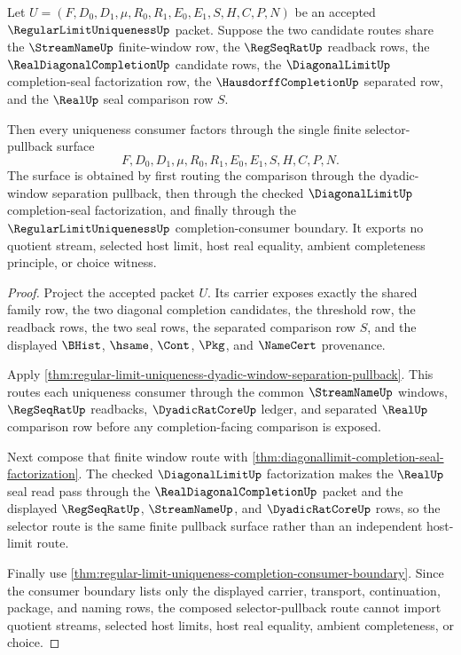 \begin{theorem}
\label{thm:regular-limit-uniqueness-seal-selector-pullback}
Let $U=(F,D_0,D_1,\mu,R_0,R_1,E_0,E_1,S,H,C,P,N)$ be an accepted $\RegularLimitUniquenessUp$ packet. Suppose the two candidate routes share the $\StreamNameUp$ finite-window row, the $\RegSeqRatUp$ readback rows, the $\RealDiagonalCompletionUp$ candidate rows, the $\DiagonalLimitUp$ completion-seal factorization row, the $\HausdorffCompletionUp$ separated row, and the $\RealUp$ seal comparison row $S$.

Then every uniqueness consumer factors through the single finite selector-pullback surface
$$
F,D_0,D_1,\mu,R_0,R_1,E_0,E_1,S,H,C,P,N.
$$
The surface is obtained by first routing the comparison through the dyadic-window separation pullback, then through the checked $\DiagonalLimitUp$ completion-seal factorization, and finally through the $\RegularLimitUniquenessUp$ completion-consumer boundary. It exports no quotient stream, selected host limit, host real equality, ambient completeness principle, or choice witness.
\end{theorem}
\begin{proof}
Project the accepted packet $U$. Its carrier exposes exactly the shared family row, the two diagonal completion candidates, the threshold row, the readback rows, the two seal rows, the separated comparison row $S$, and the displayed $\BHist$, $\hsame$, $\Cont$, $\Pkg$, and $\NameCert$ provenance.

Apply \autoref{thm:regular-limit-uniqueness-dyadic-window-separation-pullback}. This routes each uniqueness consumer through the common $\StreamNameUp$ windows, $\RegSeqRatUp$ readbacks, $\DyadicRatCoreUp$ ledger, and separated $\RealUp$ comparison row before any completion-facing comparison is exposed.

Next compose that finite window route with \autoref{thm:diagonallimit-completion-seal-factorization}. The checked $\DiagonalLimitUp$ factorization makes the $\RealUp$ seal read pass through the $\RealDiagonalCompletionUp$ packet and the displayed $\RegSeqRatUp$, $\StreamNameUp$, and $\DyadicRatCoreUp$ rows, so the selector route is the same finite pullback surface rather than an independent host-limit route.

Finally use \autoref{thm:regular-limit-uniqueness-completion-consumer-boundary}. Since the consumer boundary lists only the displayed carrier, transport, continuation, package, and naming rows, the composed selector-pullback route cannot import quotient streams, selected host limits, host real equality, ambient completeness, or choice.
\end{proof}

